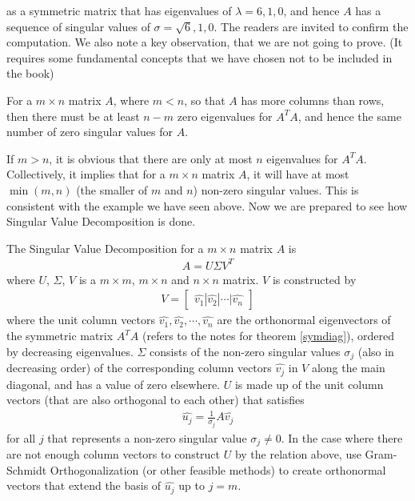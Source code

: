 as a symmetric matrix that has eigenvalues of $\lambda = 6, 1, 0$, and hence $A$ has a sequence of singular values of $\sigma = \sqrt{6}, 1, 0$. The readers are invited to confirm the computation. We also note a key observation, that we are not going to prove. (It requires some fundamental concepts that we have chosen not to be included in the book)
\begin{thm}
For a $m \times n$ matrix $A$, where $m < n$, so that $A$ has more columns than rows, then there must be at least $n-m$ zero eigenvalues for $A^TA$, and hence the same number of zero singular values for $A$.
\end{thm}
If $m > n$, it is obvious that there are only at most $n$ eigenvalues for $A^TA$. Collectively, it implies that for a $m \times n$ matrix $A$, it will have at most $\min(m,n)$ (the smaller of $m$ and $n$) non-zero singular values. This is consistent with the example we have seen above. Now we are prepared to see how Singular Value Decomposition is done.
\begin{defn}
The Singular Value Decomposition for a $m \times n$ matrix $A$ is
\begin{align*}
A = U\Sigma V^T
\end{align*}
where $U$, $\Sigma$, $V$ is a $m \times m$, $m \times n$ and $n \times n$ matrix. $V$ is constructed by
\begin{align*}
V = 
\begin{bmatrix}
\hat{v_1} | \hat{v_2} | \cdots | \hat{v_n}
\end{bmatrix}
\end{align*}
where the unit column vectors $\hat{v_1}, \hat{v_2}, \cdots, \hat{v_n}$ are the orthonormal eigenvectors of the symmetric matrix $A^TA$ (refers to the notes for theorem \ref{symdiag}), ordered by decreasing eigenvalues. $\Sigma$ consists of the non-zero singular values $\sigma_j$ (also in decreasing order) of the corresponding column vectors $\hat{v_j}$ in $V$ along the main diagonal, and has a value of zero elsewhere. $U$ is made up of the unit column vectors (that are also orthogonal to each other) that satisfies
\begin{align*}
\hat{u_j} = \frac{1}{\sigma_j} A\hat{v_j}
\end{align*}
for all $j$ that represents a non-zero singular value $\sigma_j \neq 0$. In the case where there are not enough column vectors to construct $U$ by the relation above, use Gram-Schmidt Orthogonalization (or other feasible methods) to create orthonormal vectors that extend the basis of $\hat{u_j}$ up to $j = m$.
\end{defn}

